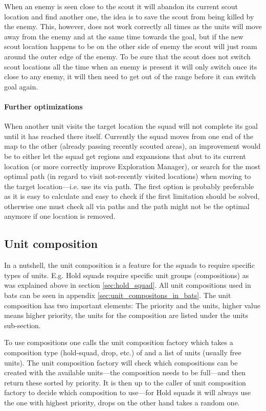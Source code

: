 When an enemy is seen close to the scout it will abandon its current scout location and find another
one, the idea is to save the scout from being killed by the enemy. This, however, does not work
correctly all times as the units will move away from the enemy and at the same time towards the
goal, but if the new scout location happens to be on the other side of enemy the scout will just
roam around the outer edge of the enemy. To be sure that the scout does not switch scout locations
all the time when an enemy is present it will only switch once its close to any enemy, it will then
need to get out of the range before it can switch goal again.

\paragraph{Further optimizations}
When another unit visits the target location the squad will not complete its goal until it has
reached there itself. Currently the squad moves from one end of the map to the other (already
passing recently scouted areas), an improvement would be to either let the squad get regions and
expansions that abut to its current location (or more correctly improve Exploration Manager), or
search for the most optimal path (in regard to visit not-recently visited locations) when moving to
the target location—i.e. use its via path. The first option is probably preferable as it is easy to
calculate and easy to check if the first limitation should be solved, otherwise one must check all
via paths and the path might not be the optimal anymore if one location is removed.

\subsection{Unit composition}
\label{sec:unit_composition}
In a nutshell, the unit composition is a feature for the squads to require specific types of units.
E.g. Hold squads require specific unit groups (compositions) as was explained above in section
\ref{sec:hold_squad}. All unit compositions used in bats can be seen in appendix
\ref{sec:unit_compositons_in_bats}. The unit composition has two important elements: The priority
and the units, higher value means higher priority, the units for the composition are listed under
the units sub-section.

To use compositions one calls the unit composition factory which takes a composition type
(hold-squad, drop, etc.) of and a list of units (usually free units). The unit composition factory
will check which compositions can be created with the available units—the composition needs to be
full—and then return these sorted by priority. It is then up to the caller of unit composition
factory to decide which composition to use—for Hold squads it will always use the one with highest
priority, drops on the other hand takes a random one.

